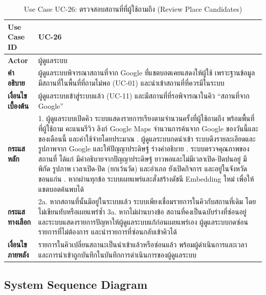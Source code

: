 \begin{table}[H]
\centering
\caption{Use Case UC-26: ตรวจสอบสถานที่ที่ผู้ใช้ถามถึง (Review Place Candidates)}
\label{tab:uc26}
\begin{tabular}{|p{3.2cm}|p{10cm}|}
\hline
\textbf{Use Case ID} & UC-26 \\ \hline
\textbf{Actor} & ผู้ดูแลระบบ \\ \hline
\textbf{คำอธิบาย} & ผู้ดูแลระบบพิจารณาสถานที่จาก Google ที่แชตบอตเคยแสดงให้ผู้ใช้ เพราะฐานข้อมูลมีสถานที่ในพื้นที่ที่ถามไม่พอ (UC-01) และนำเข้าสถานที่ที่ควรมีในระบบ \\ \hline
\textbf{เงื่อนไขเบื้องต้น} & ผู้ดูแลระบบเข้าสู่ระบบแล้ว (UC-11) และมีสถานที่ที่รอพิจารณาในคิว ``สถานที่จาก Google'' \\ \hline
\textbf{กระแสหลัก} & 1. ผู้ดูแลระบบเปิดคิว ระบบแสดงรายการเรียงตามจำนวนครั้งที่ผู้ใช้ถามถึง พร้อมพื้นที่ที่ผู้ใช้ถาม คะแนนรีวิว ลิงก์ Google Maps จำนวนการค้นจาก Google ของวันนี้และของเดือนนี้ และค่าใช้จ่ายโดยประมาณ \newline 2. ผู้ดูแลระบบกดนำเข้า ระบบดึงรายละเอียดและรูปภาพจาก Google และให้ปัญญาประดิษฐ์ ร่างคำอธิบาย \newline 3. ระบบตรวจคุณภาพของสถานที่ ได้แก่ มีคำอธิบายจากปัญญาประดิษฐ์ ยาวพอและไม่มีเวลาเปิด-ปิดปนอยู่ มีพิกัด รูปภาพ เวลาเปิด-ปิด (ยกเว้นวัด) และอำเภอ ยังเปิดกิจการ และอยู่ในจังหวัดขอนแก่น \newline 4. หากผ่านทุกข้อ ระบบเผยแพร่และสั่งสร้างดัชนี Embedding ใหม่ เพื่อให้แชตบอตค้นพบได้ \\ \hline
\textbf{กระแสทางเลือก} & 2a. หากสถานที่นั้นมีอยู่ในระบบแล้ว ระบบเพียงเชื่อมรายการในคิวกับสถานที่เดิม โดยไม่เขียนทับหรือเผยแพร่ซ้ำ \newline 3a. หากไม่ผ่านบางข้อ สถานที่คงเป็นฉบับร่างที่ซ่อนอยู่ และระบบแสดงรายการปัญหาให้ผู้ดูแลระบบแก้ก่อนเผยแพร่เอง \newline ผู้ดูแลระบบกดซ่อนรายการที่ไม่ต้องการ และนำรายการที่ซ่อนกลับเข้าคิวได้ \\ \hline
\textbf{เงื่อนไขภายหลัง} & รายการในคิวเปลี่ยนสถานะเป็นนำเข้าแล้วหรือซ่อนแล้ว พร้อมผู้ดำเนินการและเวลา และการนำเข้าถูกบันทึกในบันทึกการดำเนินการของผู้ดูแลระบบ \\
\hline
\end{tabular}
\end{table}

\clearpage
\subsection{System Sequence Diagram}

